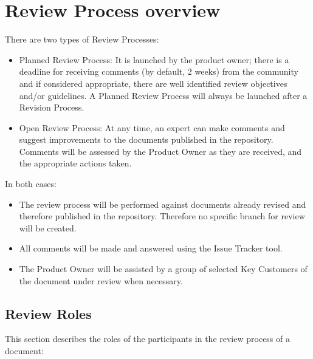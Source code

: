 \documentclass{template/openetcs_article}
\begin{document}
\section{Review Process overview}

There are two types of Review Processes:
\begin{itemize}
\item Planned Review Process: It is launched by the product owner; there is a deadline for receiving comments (by default, 2 weeks) from the community and if considered appropriate, there are well identified review objectives and/or guidelines. A Planned Review Process will always be launched after a Revision Process.
\item Open Review Process: At any time, an expert can make comments and suggest improvements to the documents published in the repository. Comments will be assessed by the Product Owner as they are received, and the appropriate actions taken.
\end{itemize}

In both cases:
\begin{itemize}
\item The review process will be performed against documents already revised and therefore published in the repository. Therefore no specific branch for review will be created.
\item All comments will be made and answered using the Issue Tracker tool.
\item The Product Owner will be assisted by a group of selected Key Customers of the document under review when necessary.
\end{itemize}

\subsection{Review Roles}

This section describes the roles of the participants in the review process of a document:
\end{document}
